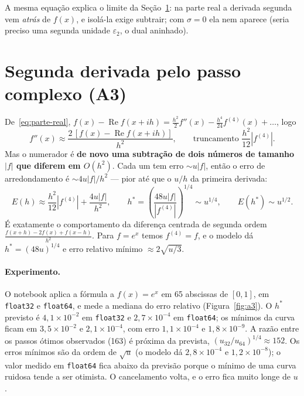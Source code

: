 \documentclass[11pt,a4paper]{article}
\renewcommand{\Re}{\operatorname{Re}}
\begin{document}
A mesma equação explica o limite da Seção~\ref{sec:segunda}: na parte real a derivada segunda vem \emph{atrás} de $f(x)$, e isolá-la exige subtrair; com $\sigma=0$ ela nem aparece (seria preciso uma segunda unidade $\varepsilon_2$, o dual aninhado).

\section{Segunda derivada pelo passo complexo (A3)}
\label{sec:segunda}

De~\eqref{eq:parte-real}, $f(x)-\Re f(x+ih) = \frac{h^2}{2}f''(x) - \frac{h^4}{24}f^{(4)}(x)+\dots$, logo
\begin{equation}
f''(x) \approx \frac{2\,[f(x)-\Re f(x+ih)]}{h^2}, \qquad \text{truncamento } \frac{h^2}{12}|f^{(4)}|.
\end{equation}
Mas o numerador é \textbf{de novo uma subtração de dois números de tamanho $|f|$ que diferem em $O(h^2)$}. Cada um tem erro $\sim u|f|$, então o erro de arredondamento é $\sim 4u|f|/h^2$ --- pior até que o $u/h$ da primeira derivada:
\begin{equation}
E(h) \approx \frac{h^2}{12}|f^{(4)}| + \frac{4u|f|}{h^2}, \qquad h^\ast = \left(\frac{48u|f|}{|f^{(4)}|}\right)^{1/4}\sim u^{1/4},\qquad E(h^\ast)\sim u^{1/2}.
\end{equation}
É exatamente o comportamento da diferença centrada de segunda ordem $\frac{f(x+h)-2f(x)+f(x-h)}{h^2}$. Para $f=e^x$ temos $f^{(4)}=f$, e o modelo dá $h^\ast=(48u)^{1/4}$ e erro relativo mínimo $\approx2\sqrt{u/3}$.

\paragraph{Experimento.} O notebook aplica a fórmula a $f(x)=e^x$ em 65 abscissas de $[0,1]$, em \texttt{float32} e \texttt{float64}, e mede a mediana do erro relativo (Figura~\ref{fig:a3}). O $h^\ast$ previsto é $4{,}1\times10^{-2}$ em \texttt{float32} e $2{,}7\times10^{-4}$ em \texttt{float64}; os mínimos da curva ficam em $3{,}5\times10^{-2}$ e $2{,}1\times10^{-4}$, com erro $1{,}1\times10^{-4}$ e $1{,}8\times10^{-9}$. A razão entre os passos ótimos observados (163) é próxima da prevista, $(u_{32}/u_{64})^{1/4}\approx152$. Os erros mínimos são da ordem de $\sqrt u$ (o modelo dá $2{,}8\times10^{-4}$ e $1{,}2\times10^{-8}$); o valor medido em \texttt{float64} fica abaixo da previsão porque o mínimo de uma curva ruidosa tende a ser otimista. O cancelamento volta, e o erro fica muito longe de $u$.
\end{document}
